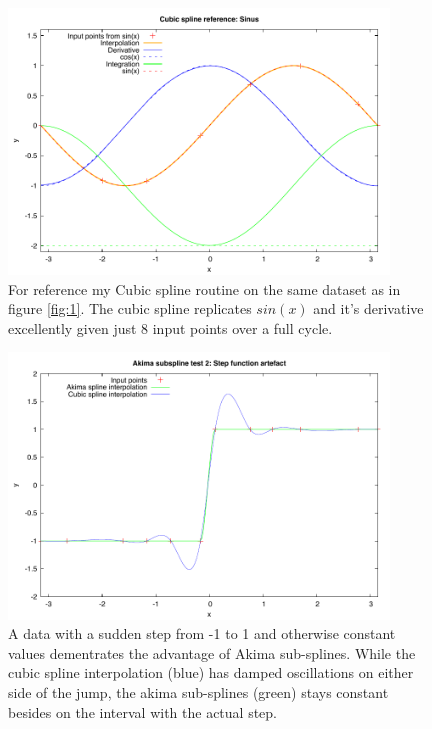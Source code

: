 \documentclass[a4paper]{article}
\begin{document}
\begin{figure}
    \centering
    \includegraphics[width=0.9\textwidth]{fig/cubic_spline_sin.pdf}
    \caption{For reference my Cubic spline routine on the same dataset as in figure \ref{fig:1}. The cubic spline replicates $sin(x)$ and it's derivative excellently given just 8 input points over a full cycle.}
    \label{fig:2}
\end{figure}

\begin{figure}
    \centering
    \includegraphics[width=0.9\textwidth]{fig/akima_spline_step.pdf}
    \caption{A data with a sudden step from -1 to 1 and otherwise constant values dementrates the advantage of Akima sub-splines. While the cubic spline interpolation (blue) has damped oscillations on either side of the jump, the akima sub-splines (green) stays constant besides on the interval with the actual step.}
    \label{fig:3}
 \end{figure}
\end{document}
